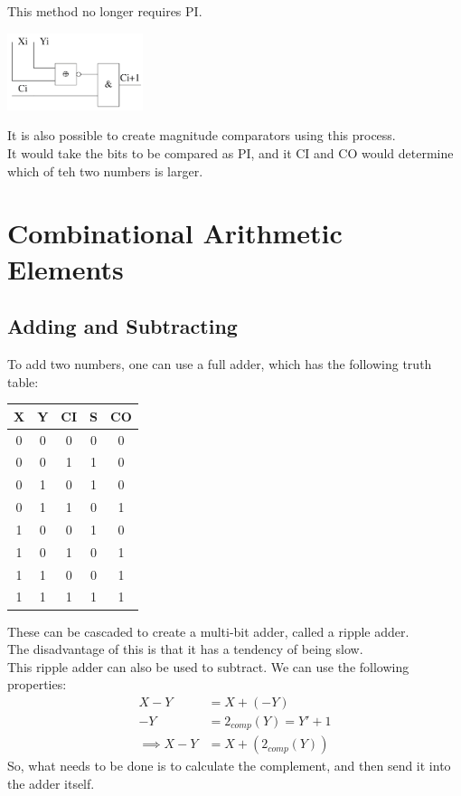 \documentclass[nobib]{tufte-handout}
\begin{document}
    This method no longer requires PI.\\
    \begin{center}
        \includegraphics[width = 150px]{images/comparatorbasic.png}
    \end{center}
    It is also possible to create magnitude comparators using this process.\\
    It would take the bits to be compared as PI, and it CI and CO would determine which of teh two numbers is larger.\\
    \section{Combinational Arithmetic Elements}
    \subsection{Adding and Subtracting}
    To add two numbers, one can use a full adder, which has the following truth
    table:\\
    \begin{table}
        \centering
        \begin{tabular}{c c c | c c}
            X & Y & CI & S & CO \\
            \hline
            0 & 0 & 0  & 0 & 0  \\
            0 & 0 & 1  & 1 & 0  \\
            0 & 1 & 0  & 1 & 0  \\
            0 & 1 & 1  & 0 & 1  \\
            1 & 0 & 0  & 1 & 0  \\
            1 & 0 & 1  & 0 & 1  \\
            1 & 1 & 0  & 0 & 1  \\
            1 & 1 & 1  & 1 & 1  \\
        \end{tabular}
    \end{table}
    These can be cascaded to create a multi-bit adder, called a ripple adder.\\
    The disadvantage of this is that it has a tendency of being slow.\\
    This ripple adder can also be used to subtract. We can use the following properties:
    \begin{align*}
        X-Y          & =X+(-Y)              \\
        -Y           & = 2_{comp}(Y) = Y'+1 \\
        \implies X-Y & = X+(2_{comp}(Y))
    \end{align*}
    So, what needs to be done is to calculate the complement, and then send it into the adder itself.\\
\end{document}
